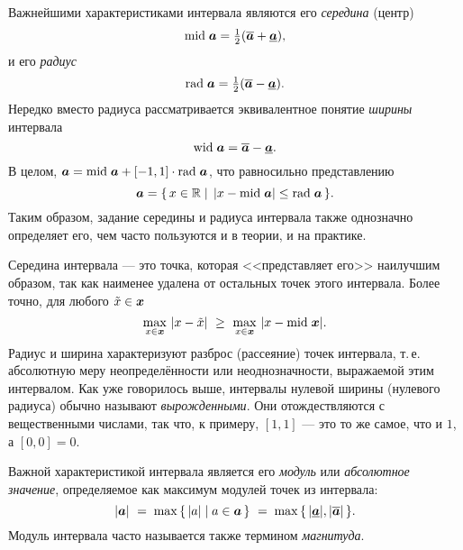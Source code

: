\documentclass[a5paper,openany]{book}
\newcommand{\mbf}[1]{\protect\text{\boldmath$#1$}}
\newcommand{\mbb}{\mathbb}
\newcommand{\ov}{\overline}
\newcommand{\un}{\underline}
\newcommand{\m}{\mathrm{mid}\;}
\newcommand{\w}{\mathrm{wid}\;}
\renewcommand{\r}{\mathrm{rad}\;}
\begin{document}
Важнейшими характеристиками интервала являются его \emph{середина} (центр) 
\begin{equation*}
\textstyle\index{середина интервала} 
\m\mbf{a} = \frac{1}{2}(\ov{\mbf{a}} + \un{\mbf{a}}),
\end{equation*}
и его \emph{радиус} 
\begin{equation*}
\textstyle\index{радиус интервала} 
\r\mbf{a} = \frac{1}{2}(\ov{\mbf{a}} - \un{\mbf{a}}).
\end{equation*} 
Нередко вместо радиуса рассматривается эквивалентное понятие \emph{ширины} 
интервала   \label{InteWid}
\begin{equation*}
\w\mbf{a} = \ov{\mbf{a}} - \un{\mbf{a}}. 
\end{equation*}
В целом, $\mbf{a} = \m\mbf{a} + [-1, 1]\cdot\r\mbf{a}$, что равносильно представлению 
\begin{equation}
\label{MidRadRepres}
\mbf{a} = \{\,x\in\mbb{R} \mid \,|x-\m\mbf{a}|\leq \r\mbf{a}\,\}.
\end{equation} 
Таким образом, задание середины и радиуса интервала также однозначно определяет его, 
чем часто пользуются и в теории, и на практике. 
  
Середина интервала --- это точка, которая <<представляет его>> наилучшим образом, 
так как наименее удалена от остальных точек этого интервала. Более точно, для любого 
$\tilde{x}\in\mbf{x}$ 
\begin{equation} 
\label{MidOptimal}
\max_{x\in\mbf{x}}\, |x - \tilde{x}| \  
   \geq \  \max_{x\in\mbf{x}}\, |x - \m\mbf{x}|. 
\end{equation} 
Радиус и ширина характеризуют разброс (рассеяние) точек интервала, т.\,е. абсолютную 
меру неопределённости или неоднозначности, выражаемой этим интервалом. Как уже 
говорилось выше, интервалы нулевой ширины (нулевого радиуса) обычно называют  
\textit{вырожденными}. Они отождествляются с вещественными числами, так что, 
к примеру, $[1, 1]$ --- это то же самое, что и $1$, а $[0, 0] = 0$. 
  
Важной характеристикой интервала является его \textit{модуль} или \textit{абсолютное 
значение}, определяемое как максимум модулей точек из интервала: 
\begin{equation} 
\label{InteModule}
\index{магнитуда}\index{модуль интервала}  
|\mbf{a}|\  = \;\max\,\{\,|a| \mid a\in\mbf{a}\,\} \ 
            = \;\max\,\{\,|\un{\mbf{a}}|, |\ov{\mbf{a}}|\,\}.  
\end{equation} 
Модуль интервала часто называется также термином \emph{магнитуда}. 
  
\end{document}
